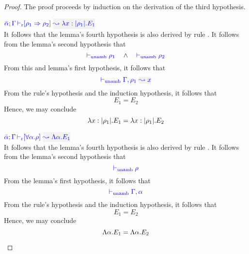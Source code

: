 \begin{proof}
The proof proceeds by induction on the derivation of the third hypothesis.
\begin{description}
\setlength{\itemsep}{1em}
\item[\fbox{\rref{R-IAbs}}]
\quad$\drres{\bar{\alpha}}{\tenv}{\rulet_1 \iarrow \rulet_2}{\abs{x}{\etrans{\rulet_1}}{E_1}}$ \\

It follows that the lemma's fourth hypothesis is also derived by rule
. It follows from the lemma's second hypothesis that 
\begin{equation*}
  {\color{blue}  \vdash_{\mathrm{unamb}}\rho_1}\quad\wedge\quad {\color{blue}  \vdash_{\mathrm{unamb}}\rho_2}
\end{equation*}
From this and lemma's first hypothesis, it follows that
\begin{equation*}
  \unambig{}{\tenv,\ie{\rulet_1}{x}}
\end{equation*}
From the rule's hypothesis and the induction hypothesis, it follows that
\begin{equation*}
  E_1 = E_2
\end{equation*}
Hence, we may conclude
\begin{equation*}
  \lambda x:|\rho_1|.E_1 =  \lambda x:|\rho_1|.E_2
\end{equation*}

\item[\fbox{\rref{R-TAbs}}]\quad$\drres{\bar{\alpha}}{\tenv}{\tall{\alpha}{\rulet}}{\Abs{\alpha}{E_1}}$ \\

It follows that the lemma's fourth hypothesis is also derived by rule
. It follows from the lemma's second hypothesis that 
\begin{equation*}
  {\color{blue}  \vdash_{\mathrm{unamb}}\rho}
\end{equation*}
From the lemma's first hypothesis, it follows that
\begin{equation*}
  {\color{blue}  \vdash_{\mathrm{unamb}}\Gamma, \alpha}
\end{equation*}
From the rule's hypothesis and the induction hypothesis, it follows that
\begin{equation*}
  E_1 = E_2
\end{equation*}
Hence, we may conclude
\begin{equation*}
  \Lambda \alpha. E_1 = \Lambda \alpha. E_2
\end{equation*}


\end{description}
\end{proof}
